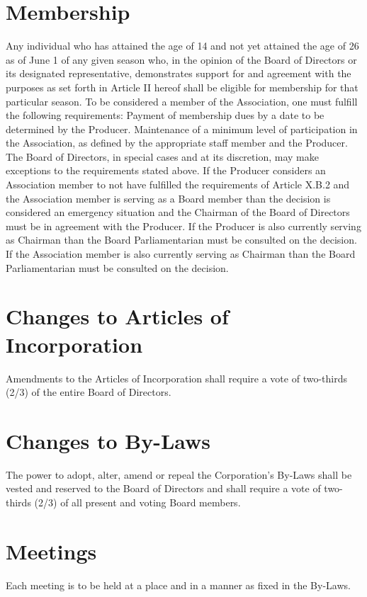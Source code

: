 \documentclass{article}
\begin{document}
\section{Membership}
\begin{outline}[enumerate]
\1 Any individual who has attained the age of 14 and not yet attained the age of 26 as of June 1 of any given season who, in the opinion of the Board of Directors or its designated representative, demonstrates support for and agreement with the purposes as set forth in Article II hereof shall be eligible for membership for that particular season.
\1 To be considered a member of the Association, one must fulfill the following requirements:
\2 Payment of membership dues by a date to be determined by the Producer.
\2 Maintenance of a minimum level of participation in the Association, as defined by the appropriate staff member and the Producer.
\1 The Board of Directors, in special cases and at its discretion, may make exceptions to the requirements stated above.
\1 If the Producer considers an Association member to not have fulfilled the requirements of Article X.B.2 and the Association member is serving as a Board member than the decision is considered an emergency situation and the Chairman of the Board of Directors must be in agreement with the Producer.  If the Producer is also currently serving as Chairman than the Board Parliamentarian must be consulted on the decision.  If the Association member is also currently serving as Chairman than the Board Parliamentarian must be consulted on the decision.
\end{outline}

\section{Changes to Articles of Incorporation}
Amendments to the Articles of Incorporation shall require a vote of two-thirds (2/3) of the entire Board of Directors.

\section{Changes to By-Laws}
The power to adopt, alter, amend or repeal the Corporation’s By-Laws shall be vested and reserved to the Board of Directors and shall require a vote of two-thirds (2/3) of all present and voting Board members.

\section{Meetings}
Each meeting is to be held at a place and in a manner as fixed in the By-Laws.
\end{document}
